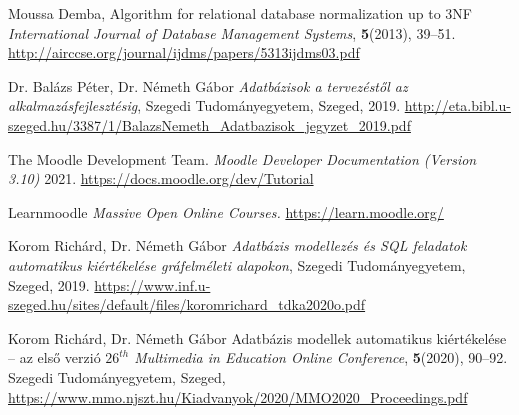 %
%


\begin{thebibliography}{9}





Moussa Demba,
Algorithm for relational database normalization up to 3NF
\emph{International Journal of Database Management Systems}, \textbf{5}(2013), 39--51.
\href{http://airccse.org/journal/ijdms/papers/5313ijdms03.pdf}{http://airccse.org/journal/ijdms/papers/5313ijdms03.pdf}

Dr. Balázs Péter, Dr. Németh Gábor
\emph{Adatbázisok a tervezéstől az alkalmazásfejlesztésig},
Szegedi Tudományegyetem, Szeged, 2019.
\href{http://eta.bibl.u-szeged.hu/3387/1/BalazsNemeth_Adatbazisok_jegyzet_2019.pdf}{http://eta.bibl.u-szeged.hu/3387/1/BalazsNemeth\_Adatbazisok\_jegyzet\_2019.pdf}

The Moodle Development Team.
\emph{Moodle Developer Documentation (Version 3.10)} 2021. \href{https://docs.moodle.org/dev/Tutorial}{https://docs.moodle.org/dev/Tutorial}

Learnmoodle
\emph{Massive Open Online Courses.} 
\href{https://learn.moodle.org/}{https://learn.moodle.org/}

Korom Richárd, Dr. Németh Gábor
\emph{Adatbázis modellezés és SQL feladatok automatikus kiértékelése gráfelméleti alapokon},
Szegedi Tudományegyetem, Szeged, 2019.
\href{https://www.inf.u-szeged.hu/sites/default/files/koromrichard_tdka2020o.pdf}{https://www.inf.u-szeged.hu/sites/default/files/koromrichard\_tdka2020o.pdf}

Korom Richárd, Dr. Németh Gábor
Adatbázis modellek automatikus kiértékelése – az első verzió\hfill \break
\emph{$26^{th}$ Multimedia in Education Online Conference}, \textbf{5}(2020), 90--92.
Szegedi Tudományegyetem, Szeged, 
\href{https://www.mmo.njszt.hu/Kiadvanyok/2020/MMO2020_Proceedings.pdf}{https://www.mmo.njszt.hu/Kiadvanyok/2020/MMO2020\_Proceedings.pdf}

\end{thebibliography}